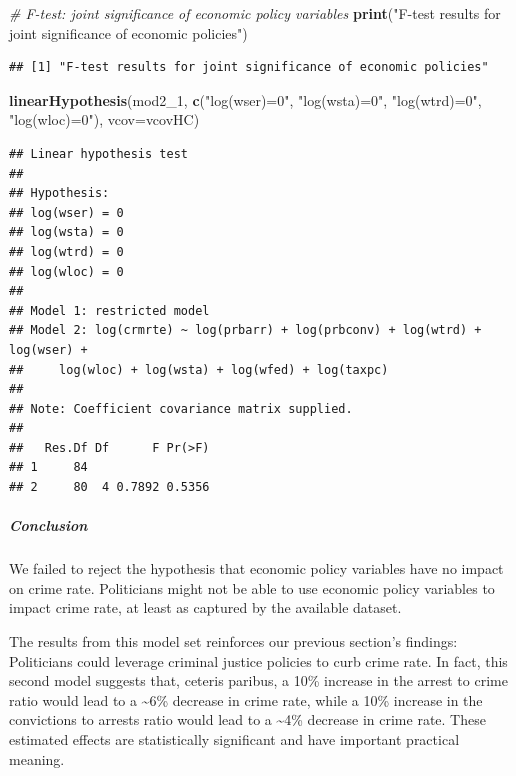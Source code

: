\documentclass[]{article}
\newenvironment{Shaded}{\begin{snugshade}}{\end{snugshade}}
\newcommand{\CommentTok}[1]{\textcolor[rgb]{0.56,0.35,0.01}{\textit{#1}}}
\newcommand{\DataTypeTok}[1]{\textcolor[rgb]{0.13,0.29,0.53}{#1}}
\newcommand{\DecValTok}[1]{\textcolor[rgb]{0.00,0.00,0.81}{#1}}
\newcommand{\KeywordTok}[1]{\textcolor[rgb]{0.13,0.29,0.53}{\textbf{#1}}}
\newcommand{\NormalTok}[1]{#1}
\newcommand{\StringTok}[1]{\textcolor[rgb]{0.31,0.60,0.02}{#1}}
\let\oldsubparagraph\subparagraph
\renewcommand{\subparagraph}[1]{\oldsubparagraph{#1}\mbox{}}
\begin{document}
\begin{Shaded}
\begin{Highlighting}[]
\CommentTok{# F-test: joint significance of economic policy variables}
\KeywordTok{print}\NormalTok{(}\StringTok{"F-test results for joint significance of economic policies"}\NormalTok{) }
\end{Highlighting}
\end{Shaded}

\begin{verbatim}
## [1] "F-test results for joint significance of economic policies"
\end{verbatim}

\begin{Shaded}
\begin{Highlighting}[]
\KeywordTok{linearHypothesis}\NormalTok{(mod2_}\DecValTok{1}\NormalTok{, }\KeywordTok{c}\NormalTok{(}\StringTok{"log(wser)=0"}\NormalTok{, }\StringTok{"log(wsta)=0"}\NormalTok{, }\StringTok{"log(wtrd)=0"}\NormalTok{, }\StringTok{"log(wloc)=0"}\NormalTok{), }\DataTypeTok{vcov=}\NormalTok{vcovHC)}
\end{Highlighting}
\end{Shaded}

\begin{verbatim}
## Linear hypothesis test
## 
## Hypothesis:
## log(wser) = 0
## log(wsta) = 0
## log(wtrd) = 0
## log(wloc) = 0
## 
## Model 1: restricted model
## Model 2: log(crmrte) ~ log(prbarr) + log(prbconv) + log(wtrd) + log(wser) + 
##     log(wloc) + log(wsta) + log(wfed) + log(taxpc)
## 
## Note: Coefficient covariance matrix supplied.
## 
##   Res.Df Df      F Pr(>F)
## 1     84                 
## 2     80  4 0.7892 0.5356
\end{verbatim}

\hypertarget{conclusion-1}{%
\subparagraph{Conclusion}\label{conclusion-1}}

We failed to reject the hypothesis that economic policy variables have
no impact on crime rate. Politicians might not be able to use economic
policy variables to impact crime rate, at least as captured by the
available dataset.

The results from this model set reinforces our previous section's
findings: Politicians could leverage criminal justice policies to curb
crime rate. In fact, this second model suggests that, ceteris paribus, a
10\% increase in the arrest to crime ratio would lead to a
\textasciitilde{}6\% decrease in crime rate, while a 10\% increase in
the convictions to arrests ratio would lead to a \textasciitilde{}4\%
decrease in crime rate. These estimated effects are statistically
significant and have important practical meaning.
\end{document}
